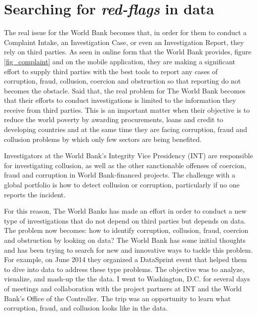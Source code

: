 \section{Searching for \textit{red-flags} in data}

The real issue for the World Bank becomes that, in order for them to conduct a Complaint Intake, an Investigation Case, or even an Investigation Report, they rely on third parties. As seen in online form that the World Bank provides, figure  \ref{fig_complaint} and on the mobile application, they are making a significant effort to supply third parties with the best tools to report any cases of corruption, fraud, collusion, coercion and  obstruction so that reporting do not becomes the obstacle. Said that, the real problem for The World Bank becomes that their efforts to conduct investigations is limited to the information they receive from third parties. This is an important matter when their objective is to reduce the world poverty by awarding procurements, loans and credit to developing countries and at the same time they are facing corruption, fraud and collusion problems by which only few sectors are being benefited.

Investigators at the World Bank's Integrity Vice Presidency (INT) are responsible for investigating collusion, as well as the other sanctionable offenses of coercion, fraud and corruption in World Bank-financed projects. The challenge with a global portfolio is how to detect collusion or corruption, particularly if no one reports the incident.

For this reason, The World Banks has made an effort in order to conduct a new type of investigations that do not depend on third parties but depends on data. The problem now becomes: how to identify corruption, collusion, fraud, coercion and obstruction by looking on data? The World Bank has some initial thoughts and has been trying to search for new and innovative ways to tackle this problem. For example, on June 2014 they organized a DataSprint event that helped them to dive into data to address these type problems. The objective was to analyze, visualize, and mash-up the the data. I went to Washington, D.C. for several days of meetings and collaboration with the project partners at INT and the World Bank's Office of the Controller. The trip was an opportunity to learn what corruption, fraud, and collusion looks like in the data.

